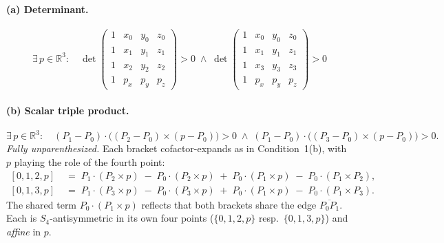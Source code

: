 \documentclass[11pt]{article}
\begin{document}
\paragraph{(a) Determinant.}
\[
\exists\, p\in\mathbb{R}^3:\quad
\det\!\begin{pmatrix} 1 & x_0 & y_0 & z_0 \\ 1 & x_1 & y_1 & z_1 \\ 1 & x_2 & y_2 & z_2 \\ 1 & p_x & p_y & p_z \end{pmatrix} > 0
\;\wedge\;
\det\!\begin{pmatrix} 1 & x_0 & y_0 & z_0 \\ 1 & x_1 & y_1 & z_1 \\ 1 & x_3 & y_3 & z_3 \\ 1 & p_x & p_y & p_z \end{pmatrix} > 0
\]

\paragraph{(b) Scalar triple product.}
\[
\exists\, p\in\mathbb{R}^3:\quad
(P_1{-}P_0)\cdot\bigl((P_2{-}P_0)\times(p{-}P_0)\bigr) > 0
\;\wedge\;
(P_1{-}P_0)\cdot\bigl((P_3{-}P_0)\times(p{-}P_0)\bigr) > 0.
\]
\emph{Fully unparenthesized.} Each bracket cofactor-expands as in
Condition~1(b), with $p$ playing the role of the fourth point:
\[
\begin{aligned}
{[0,1,2,p]} \;&=\; P_1\!\cdot\!(P_2\!\times\!p) \;-\; P_0\!\cdot\!(P_2\!\times\!p) \;+\; P_0\!\cdot\!(P_1\!\times\!p) \;-\; P_0\!\cdot\!(P_1\!\times\!P_2),\\
{[0,1,3,p]} \;&=\; P_1\!\cdot\!(P_3\!\times\!p) \;-\; P_0\!\cdot\!(P_3\!\times\!p) \;+\; P_0\!\cdot\!(P_1\!\times\!p) \;-\; P_0\!\cdot\!(P_1\!\times\!P_3).
\end{aligned}
\]
The shared term $P_0\!\cdot\!(P_1\!\times\!p)$ reflects that both brackets share
the edge $\overline{P_0P_1}$. Each is $S_4$-antisymmetric in its own four points
($\{0,1,2,p\}$ resp.\ $\{0,1,3,p\}$) and \emph{affine} in $p$.
\end{document}
